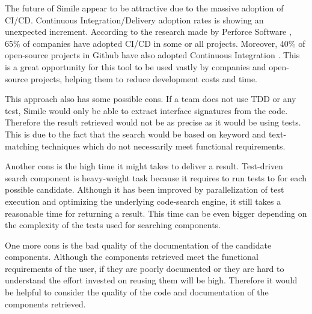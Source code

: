 The future of Simile appear to be attractive due to the massive adoption of CI/CD. Continuous Integration/Delivery adoption rates is showing an unexpected increment. According to the research made by Perforce Software \cite{Perforce2015}, 65\% of companies have adopted CI/CD in some or all projects. Moreover, 40\% of open-source projects in Github have also adopted Continuous Integration \cite{Hilton2016}. This is a great opportunity for this tool to be used vastly by companies and open-source projects, helping them to reduce development costs and time.


This approach also has some possible cons. If a team does not use TDD or any test, Simile would only be able to extract interface signatures from the code. Therefore the result retrieved would not be as precise as it would be using tests. This is due to the fact that the search would be based on keyword and text-matching techniques which do not necessarily meet functional requirements.

Another cons is the high time it might takes to deliver a result. Test-driven search component is heavy-weight task because it requires to run tests to for each possible candidate. Although it has been improved by parallelization of test execution and optimizing the underlying code-search engine, it still takes a reasonable time for returning a result. This time can be even bigger depending on the complexity of the tests used for searching components.

One more cons is the bad quality of the documentation of the candidate components. Although the components retrieved meet the functional requirements of the user, if they are poorly documented or they are hard to understand the effort invested on reusing them will be high. Therefore it would be helpful to consider the quality of the code and documentation of the components retrieved.


 